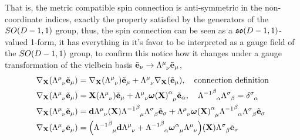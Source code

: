 That is, the metric compatible spin connection is anti-symmetric in the non-coordinate indices, exactly the property 
satisfied by the generators of the $SO\qty(D-1,1)$ group, thus, the spin connection can be seen as a $\mathfrak{so}\qty(D-1,1)$-valued 1-form, it has 
everything in it's favor to be interpreted as a gauge field of the $SO\qty(D-1,1)$ group, to confirm this notice how it changes under a gauge transformation 
of the vielbein basis $\tilde{\vb e}_\nu\rightarrow\tensor{\Lambda}{^\mu_\nu}\tilde{\vb e}_\mu$,
\begin{align*}
    \nabla_{\vb X}\qty(\tensor{\Lambda}{^\mu_\nu}\tilde{\vb e}_\mu)&=\nabla_{\vb X }\qty(\tensor{\Lambda}{^\mu_\nu})\tilde{\vb e}_\mu+\tensor{\Lambda}{^\mu_\nu}\nabla_{\vb X}\qty(\tilde{\vb e}_\mu),\ \ \ \textnormal{connection definition}\\
    \nabla_{\vb X}\qty(\tensor{\Lambda}{^\mu_\nu}\tilde{\vb e}_\mu)&=\vb X\qty(\tensor{\Lambda}{^\mu_\nu})\tilde{\vb e}_\mu+\tensor{\Lambda}{^\mu_\nu}\tensor{{\boldsymbol\omega\qty(\vb X)}}{^\alpha_\mu}\tilde{\vb e}_\alpha,\ \ \ \tensor{{\Lambda^{-1}}}{^\beta_\alpha}\tensor{\Lambda}{^\sigma_\beta}=\tensor{\delta}{^\sigma_\alpha}\\
    \nabla_{\vb X}\qty(\tensor{\Lambda}{^\mu_\nu}\tilde{\vb e}_\mu)&=\vb d\tensor{\Lambda}{^\mu_\nu}\qty(\vb X)\tensor{{\Lambda^{-1}}}{^\beta_\mu}\tensor{\Lambda}{^\sigma_\beta}\tilde{\vb e}_\sigma+\tensor{\Lambda}{^\mu_\nu}\tensor{{\boldsymbol\omega\qty(\vb X)}}{^\alpha_\mu}\tensor{{\Lambda^{-1}}}{^\beta_\alpha}\tensor{\Lambda}{^\sigma_\beta}\tilde{\vb e}_\sigma\\
    \nabla_{\vb X}\qty(\tensor{\Lambda}{^\mu_\nu}\tilde{\vb e}_\mu)&=\qty(\tensor{{\Lambda^{-1}}}{^\beta_\mu}\vb d{\tensor{\Lambda}{^\mu_\nu}}+\tensor{{\Lambda^{-1}}}{^\beta_\alpha}\tensor{{\boldsymbol\omega}}{^\alpha_\mu}\tensor{\Lambda}{^\mu_\nu})\qty(\vb X)\tensor{\Lambda}{^\sigma_\beta}\tilde{\vb e}_\sigma
\end{align*}

